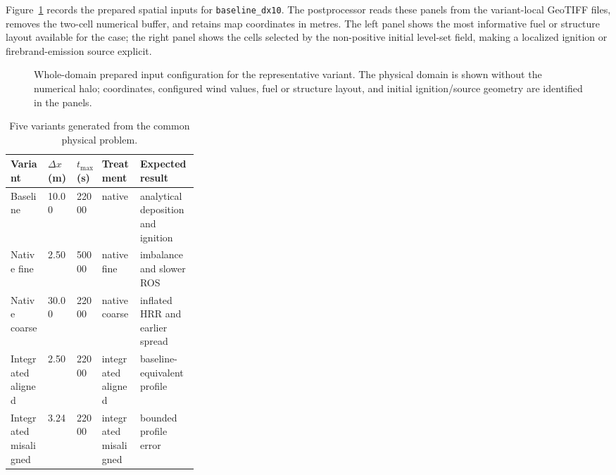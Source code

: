 Figure~\ref{fig:input-configuration} records the prepared spatial inputs for \texttt{baseline\_dx10}.
The postprocessor reads these panels from the variant-local GeoTIFF files, removes the
two-cell numerical buffer, and retains map coordinates in metres.  The left panel shows
the most informative fuel or structure layout available for the case; the right panel
shows the cells selected by the non-positive initial level-set field, making a localized
ignition or firebrand-emission source explicit.

\begin{figure}[H]
\centering
{}
\caption{Whole-domain prepared input configuration for the representative variant.  The
physical domain is shown without the numerical halo; coordinates, configured wind values,
fuel or structure layout, and initial ignition/source geometry are identified in the panels.}
\label{fig:input-configuration}
\end{figure}


\begin{table}[H]
\centering\small
\caption{Five variants generated from the common physical problem.}
\begin{tabular}{llllp{0.31\linewidth}}
\toprule
Variant & \(\Delta x\) (m) & \(t_{\max}\) (s) & Treatment & Expected result\\
\midrule
Baseline & 10.00 & 22000 & native & analytical deposition and ignition\\
Native fine & 2.50 & 50000 & native fine & imbalance and slower ROS\\
Native coarse & 30.00 & 22000 & native coarse & inflated HRR and earlier spread\\
Integrated aligned & 2.50 & 22000 & integrated aligned & baseline-equivalent profile\\
Integrated misaligned & 3.24 & 22000 & integrated misaligned & bounded profile error\\
\bottomrule
\end{tabular}
\end{table}

